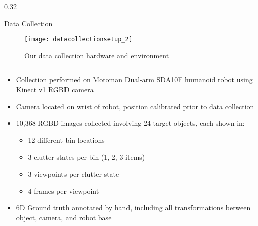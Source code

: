 
\begin{columns}[t]
	\begin{column} {0.32\textwidth}
		\begin{block}{\large Data Collection}
			\centering
				\vspace{0.2in}
				\begin{figure}[h]
					\texttt{[image: datacollectionsetup\_2]}
					\caption{Our data collection hardware and environment}
				\end{figure}
					\begin{columns}[t]
						\begin{column}{0.94\textwidth}
							\begin{itemize}
								\item Collection performed on Motoman Dual-arm SDA10F humanoid robot using Kinect v1 RGBD camera
								\item Camera located on wrist of robot, position calibrated prior to data collection
								\item 10,368 RGBD images collected involving 24 target objects, each shown in:
									\begin{itemize}
										\item 12 different bin locations
										\item 3 clutter states per bin (1, 2, 3 items)
										\item 3 viewpoints per clutter state
										\item 4 frames per viewpoint
									\end{itemize}
								\item 6D Ground truth annotated by hand, including all transformations between object, camera, and robot base
							\end{itemize}
						\end{column}
					\end{columns}
				\vspace{0.1in}
		\end{block}

\end{column}
\end{columns}
